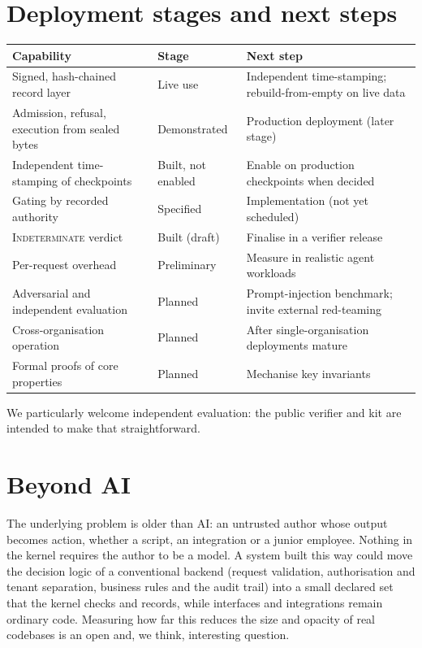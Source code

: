 \documentclass[11pt,a4paper]{article}
\begin{document}
\section{Deployment stages and next steps}\label{sec:roadmap}

\begin{table}[h]
\centering\small
\begin{tabularx}{\linewidth}{@{}>{\raggedright\arraybackslash}p{4.6cm}>{\raggedright\arraybackslash}p{2.4cm}L@{}}
\toprule
Capability & Stage & Next step \\
\midrule
Signed, hash-chained record layer & Live use & Independent time-stamping; rebuild-from-empty on live data \\
Admission, refusal, execution from sealed bytes & Demonstrated & Production deployment (later stage) \\
Independent time-stamping of checkpoints & Built, not enabled & Enable on production checkpoints when decided \\
Gating by recorded authority & Specified & Implementation (not yet scheduled) \\
\textsc{Indeterminate} verdict & Built (draft) & Finalise in a verifier release \\
Per-request overhead & Preliminary & Measure in realistic agent workloads \\
Adversarial and independent evaluation & Planned & Prompt-injection benchmark; invite external red-teaming \\
Cross-organisation operation & Planned & After single-organisation deployments mature \\
Formal proofs of core properties & Planned & Mechanise key invariants \\
\bottomrule
\end{tabularx}
\end{table}

We particularly welcome independent evaluation: the public verifier and kit are intended to make that straightforward.

\section{Beyond AI}

The underlying problem is older than AI: an untrusted author whose output becomes action, whether a script, an integration or a junior employee. Nothing in the kernel requires the author to be a model. A system built this way could move the decision logic of a conventional backend (request validation, authorisation and tenant separation, business rules and the audit trail) into a small declared set that the kernel checks and records, while interfaces and integrations remain ordinary code. Measuring how far this reduces the size and opacity of real codebases is an open and, we think, interesting question.
\end{document}
